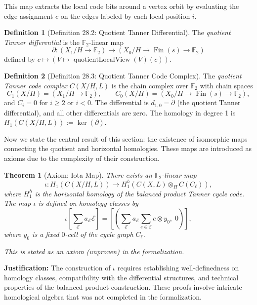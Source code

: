 \documentclass[11pt]{article}
\theoremstyle{plain}
\newtheorem*{theorem}{Theorem}
\theoremstyle{definition}
\newtheorem*{definition}{Definition}
\theoremstyle{remark}
\renewcommand{\ker}{\operatorname{ker}}
\begin{document}
This map extracts the local code bits around a vertex orbit by evaluating the edge assignment $c$ on the edges labeled by each local position $i$.

\begin{definition}[Definition 28.2: Quotient Tanner Differential]
The \emph{quotient Tanner differential} is the $\mathbb{F}_2$-linear map
\[
\partial : (X_1/H \to \mathbb{F}_2) \to (X_0/H \to \operatorname{Fin}(s) \to \mathbb{F}_2)
\]
defined by $c \mapsto (V \mapsto \operatorname{quotientLocalView}(V)(c))$.
\end{definition}

\begin{definition}[Definition 28.3: Quotient Tanner Code Complex]
The \emph{quotient Tanner code complex} $C(X/H, L)$ is the chain complex over $\mathbb{F}_2$ with chain spaces
\[
C_1(X/H) = (X_1/H \to \mathbb{F}_2), \qquad C_0(X/H) = (X_0/H \to \operatorname{Fin}(s) \to \mathbb{F}_2),
\]
and $C_i = 0$ for $i \geq 2$ or $i < 0$. The differential is $d_{1,0} = \partial$ (the quotient Tanner differential), and all other differentials are zero. The homology in degree 1 is $H_1(C(X/H, L)) := \ker(\partial)$.
\end{definition}

Now we state the central result of this section: the existence of isomorphic maps connecting the quotient and horizontal homologies. These maps are introduced as axioms due to the complexity of their construction.

\begin{theorem}[Axiom: Iota Map]
There exists an $\mathbb{F}_2$-linear map
\[
\iota : H_1(C(X/H, L)) \to H_1^h(C(X,L) \otimes_H C(C_\ell)),
\]
where $H_1^h$ is the horizontal homology of the balanced product Tanner cycle code. The map $\iota$ is defined on homology classes by
\[
\iota\!\left[\sum_{\mathcal{E}} a_{\mathcal{E}} \mathcal{E}\right] = \left[\left(\sum_{\mathcal{E}} a_{\mathcal{E}} \sum_{e \in \mathcal{E}} e \otimes y_0,\; 0\right)\right],
\]
where $y_0$ is a fixed $0$-cell of the cycle graph $C_\ell$.

\textit{This is stated as an axiom (unproven) in the formalization.}
\end{theorem}

\textbf{Justification:} The construction of $\iota$ requires establishing well-definedness on homology classes, compatibility with the differential structures, and technical properties of the balanced product construction. These proofs involve intricate homological algebra that was not completed in the formalization.
\end{document}
